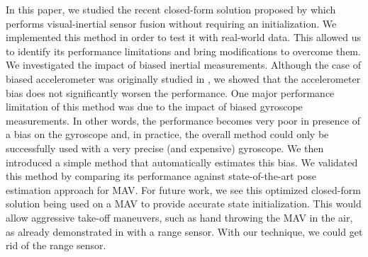 \documentclass[letterpaper, 10 pt, journal, final]{ieeeconf}  %
\begin{document}
In this paper, we studied the recent closed-form solution proposed by \cite{Martinelli2014} which performs visual-inertial sensor fusion without requiring an initialization.
We implemented this method in order to test it with real-world data.
This allowed us to identify its performance limitations and bring modifications to overcome them.
We investigated the impact of biased inertial measurements.
Although the case of biased accelerometer was originally studied in \cite{Martinelli2014}, we showed that the accelerometer bias does not significantly worsen the performance.
One major performance limitation of this method was due to the impact of biased gyroscope measurements.
In other words, the performance becomes very poor in presence of a bias on the gyroscope and, in practice, the overall method could only be successfully used with a very precise (and expensive) gyroscope.
We then introduced a simple method that automatically estimates this bias.
We validated this method by comparing its performance against state-of-the-art pose estimation approach for MAV.
For future work, we see this optimized closed-form solution being used on a MAV to provide accurate state initialization.
This would allow aggressive take-off maneuvers, such as hand throwing the MAV in the air, as already demonstrated in \cite{Faessler2015} with a range sensor.
With our technique, we could get rid of the range sensor.



\end{document}
